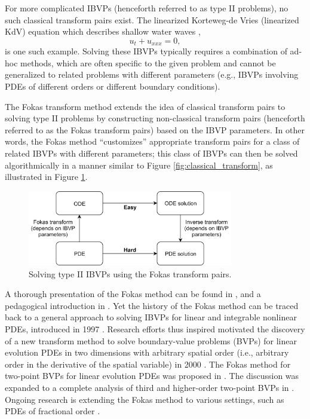 \documentclass[12pt, oneside, a4paper]{article}
\begin{document}
For more complicated IBVPs (henceforth referred to as type II problems), no such classical transform pairs exist. The linearized Korteweg-de Vries (linearized KdV) equation which describes shallow water waves \cite{Korteweg1895},
\begin{equation}\label{eq:linearied_kdv}
    u_t + u_{xxx} = 0,
\end{equation}
is one such example. Solving these IBVPs typically requires a combination of ad-hoc methods, which are often specific to the given problem and cannot be generalized to related problems with different parameters (e.g., IBVPs involving PDEs of different orders or different boundary conditions). 

The Fokas transform method extends the idea of classical transform pairs to solving type II problems by constructing non-classical transform pairs (henceforth referred to as the Fokas transform pairs) based on the IBVP parameters. In other words, the Fokas method ``customizes'' appropriate transform pairs for a class of related IBVPs with different parameters; this class of IBVPs can then be solved algorithmically in a manner similar to Figure \ref{fig:classical_transform}, as illustrated in Figure \ref{fig:fokas_transform}.
\begin{figure}[htpb!]
    \centering
    \includegraphics[width=0.8\textwidth]{fokas_transform.png}
    \caption{Solving type II IBVPs using the Fokas transform pairs.}
    \label{fig:fokas_transform}
\end{figure}

A thorough presentation of the Fokas method can be found in \cite{Fokas2008}, and a pedagogical introduction in \cite{Deconinck2014}. Yet the history of the Fokas method can be traced back to a general approach to solving IBVPs for linear and integrable nonlinear PDEs, introduced in 1997 \cite{Fokas1997}. Research efforts thus inspired motivated the discovery of a new transform method to solve boundary-value problems (BVPs) for linear evolution PDEs in two dimensions with arbitrary spatial order (i.e., arbitrary order in the derivative of the spatial variable) in 2000 \cite{Fokas2000}. The Fokas method for two-point BVPs for linear evolution PDEs was proposed in \cite{Fokas2001}. The discussion was expanded to a complete analysis of third and higher-order two-point BVPs in \cite{Smith2012}. Ongoing research is extending the Fokas method to various settings, such as PDEs of fractional order \cite{Fernandez2018}.
\end{document}

